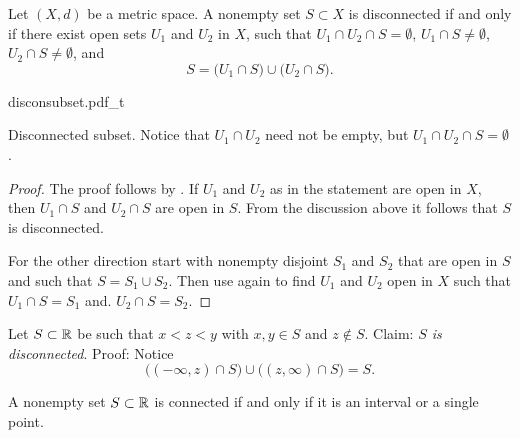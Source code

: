 \begin{prop}
Let $(X,d)$ be a metric space.
A nonempty set $S \subset X$ is disconnected if and only if
there exist open sets $U_1$ and
$U_2$ in $X$, such that $U_1 \cap U_2 \cap S = \emptyset$,
$U_1 \cap S \not= \emptyset$,
$U_2 \cap S \not= \emptyset$, and
\begin{equation*}
S = 
\bigl( U_1 \cap S \bigr)
\cup
\bigl( U_2 \cap S \bigr) .
\end{equation*}
\end{prop}

\begin{myfigureht}
{disconsubset.pdf_t}
\caption{Disconnected subset.  Notice that $U_1 \cap U_2$ need
not be empty, but $U_1 \cap U_2 \cap S = \emptyset$.\label{fig:disconsubset}}
\end{myfigureht}


\begin{proof}
The proof follows by .
If $U_1$ and $U_2$ as in the statement are open in $X$,
then $U_1 \cap S$ and $U_2 \cap S$ are open in $S$.
From the discussion above it follows that $S$ is disconnected.

For the other direction start with nonempty disjoint $S_1$ and $S_2$ that are
open in $S$ and such that $S = S_1 \cup S_2$.  Then use
 again to find $U_1$ and $U_2$
open in $X$ such that $U_1 \cap S = S_1$ and.
$U_2 \cap S = S_2$.
\end{proof}

\begin{example}
Let $S \subset {\mathbb{R}}$ be such that $x < z < y$ with $x,y \in S$
and $z \notin S$.  Claim: \emph{$S$ is disconnected}.  Proof:  Notice
\begin{equation*}
\bigl( (-\infty,z) \cap S \bigr)
\cup
\bigl( (z,\infty) \cap S \bigr)
= S .
\end{equation*}
\end{example}

\begin{prop}
A nonempty set $S \subset {\mathbb{R}}$ is connected if and only if it is
an interval or a single point.
\end{prop}


